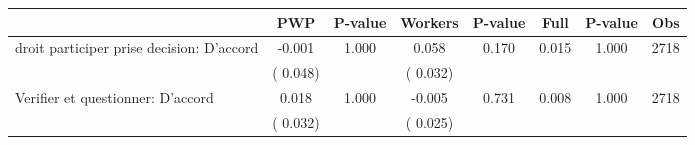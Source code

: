 
\begin{tabular}{l*{7}{c}}\hline&\multicolumn{1}{c}{PWP}&\multicolumn{1}{c}{P-value}&\multicolumn{1}{c}{Workers}&\multicolumn{1}{c}{P-value}&\multicolumn{1}{c}{Full}&\multicolumn{1}{c}{P-value}&\multicolumn{1}{c}{Obs} \\ \hline

 droit participer prise decision: D'accord       &             -0.001       &        1.000  &              0.058       &        0.170  &              0.015       &              1.000 &  2718 \\ 
                       &       (       0.048)             &                               &       (       0.032)                     &                               &                                               &                                &                      \\ 

 Verifier et questionner: D'accord       &              0.018       &        1.000  &             -0.005       &        0.731  &              0.008       &              1.000 &  2718 \\ 
                       &       (       0.032)             &                               &       (       0.025)                     &                               &                                               &                                &                      \\ 

\hline \end{tabular}